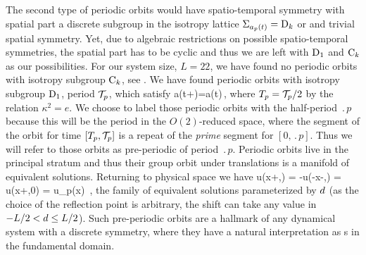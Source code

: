 The second type of periodic orbits would have spatio-temporal symmetry
with spatial part a discrete subgroup in the isotropy lattice
$\Sigma_{a_p(t)}=\mathrm{D}_{k}$ or  and trivial spatial symmetry.
Yet, due
to algebraic restrictions on possible spatio-temporal
symmetries, the
spatial part has to be cyclic and thus we are left with
$\mathrm{D}_{1}$ and $\mathrm{C}_{k}$ as our possibilities. For our system
size, $L=22$, we have found no periodic orbits with isotropy
subgroup $\mathrm{C}_{k}$, see . We have found
periodic orbits with isotropy subgroup $\mathrm{D}_{1}$, period
${\mathcal{T}_{p}}$, which satisfy
\beq
	\Refl a(t+)=a(t)\,,
	\label{eq:ppo}
\eeq
where ${T_{p}}={\mathcal{T}_{p}}/2$ by the relation $\kappa^2=e$. We choose to label those
periodic orbits with the half-period $\period{p}$ because this will be the period in the $O(2)$-reduced space,
where the segment of the orbit for time $[{T_{p}},{\mathcal{T}_{p}}]$ is a repeat of the \emph{prime} segment
for $[0,\period{p}]$. Thus we will refer to those orbits as pre-periodic of period $\period{p}$.
Periodic orbits  live in the principal stratum and thus their group orbit under translations  is a manifold of equivalent solutions. Returning to physical space we have
\beq
  \Refl u(x+\shift,) =
  -u(-x-\shift,) = u(x+\shift,0) = u_p(x)
  \,,
\label{KSpos}
\eeq
the family of equivalent solutions
parameterized by $d$
(as the choice of the reflection point is arbitrary,
the shift can take any value in $-L/2 < d \leq L/2$).
Such pre-periodic orbits
are a hallmark of any dynamical system with a discrete
symmetry, where they have a natural
interpretation as \po s in the
fundamental domain.


